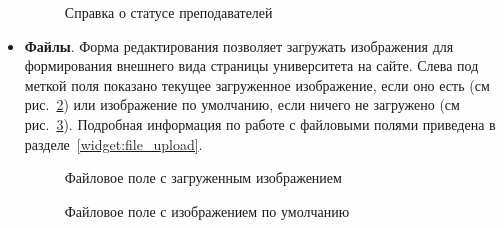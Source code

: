 \begin{itemize}
		\begin{figure}[H]
		\caption{Справка о статусе преподавателей}
		\label{university:edit_instructors_legend}
		\end{figure}	
		
		\item \textbf{Файлы}. Форма редактирования позволяет загружать изображения для формирования внешнего вида страницы университета на сайте. Слева под меткой поля показано текущее загруженное изображение, если оно есть (см рис.~\ref{university:edit_logo}) или изображение по умолчанию, если ничего не загружено (см рис.~\ref{university:edit_icon_image}). Подробная информация по работе с файловыми полями приведена в разделе~\ref{widget:file_upload}.

		\begin{figure}[H]
		\caption{Файловое поле с загруженным изображением}
		\label{university:edit_logo}
		\end{figure}	
		
		\begin{figure}[H]
		\caption{Файловое поле с изображением по умолчанию}
		\label{university:edit_icon_image}
		\end{figure}
\end{itemize}


